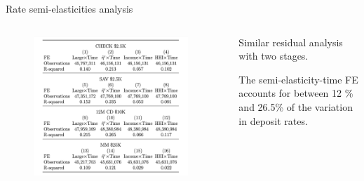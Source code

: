 \documentclass[notes,10pt, aspectratio=169]{beamer}
\newenvironment{wideitemize}{\itemize\addtolength{\itemsep}{10pt}}{\enditemize}
\begin{document}
\begin{frame}{Rate semi-elasticities analysis}

    \begin{columns}[T]
        
        \begin{column}{0.5\textwidth}
        
            \begin{figure}
                \centering
                \includegraphics[width=0.95\textwidth]{imgs/tab7.png}
            \end{figure}

        \end{column}
        \begin{column}{0.5\textwidth}
        

            \begin{wideitemize}
                \item Similar residual analysis with two stages.
                \item The semi-elasticity-time FE accounts for between 12 \% and 26.5\% of the variation in deposit rates.
            \end{wideitemize}
        \end{column}
    \end{columns}
            
\end{frame}
        
\end{document}
